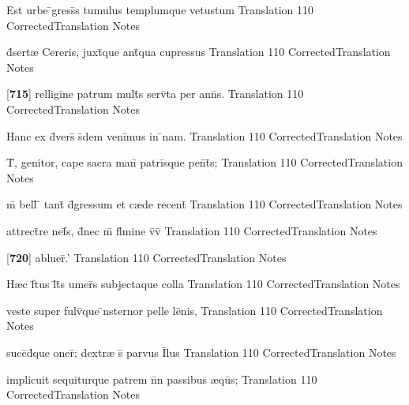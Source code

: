 \latline
  {Est urbe \={}gress\={\macron {\i}}s tumulus templumque vetustum}
  { Translation }
  {110}
  { CorrectedTranslation }
  { Notes }


\latline
  {d\={}sert{\ae} Cereris, juxt\={}que ant\={\macron {\i}}qua cupressus}
  { Translation }
  {110}
  { CorrectedTranslation }
  { Notes }


\latline
  {[\textbf{715}] relligi\={}ne patrum mult\={}s serv\={}ta per ann\={}s.}
  { Translation }
  {110}
  { CorrectedTranslation }
  { Notes }


\latline
  {Hanc ex d\={\macron {\i}}vers\={} s\={}dem veni\={}mus in \={}nam.}
  { Translation }
  {110}
  { CorrectedTranslation }
  { Notes }


\latline
  {T\={}, genitor, cape sacra man\={} patri\={}sque pen\={}t\={\macron {\i}}s;}
  { Translation }
  {110}
  { CorrectedTranslation }
  { Notes }


\latline
  {m\={} bell\={} \={} tant\={} d\={\macron {\i}}gressum et c{\ae}de recent\={\macron {\i}}}
  { Translation }
  {110}
  { CorrectedTranslation }
  { Notes }


\latline
  {attrect\={}re nef\={}s, d\={}nec m\={} fl\={}mine v\={\macron {\i}}v\={}}
  { Translation }
  {110}
  { CorrectedTranslation }
  { Notes }


\latline
  {[\textbf{720}] abluer\={}.'}
  { Translation }
  {110}
  { CorrectedTranslation }
  { Notes }


\latline
  {H{\ae}c f\={}tus l\={}t\={}s umer\={}s subjectaque colla}
  { Translation }
  {110}
  { CorrectedTranslation }
  { Notes }


\latline
  {veste super fulv\={\macron {\i}}que \={\macron {\i}}nsternor pelle le\={}nis,}
  { Translation }
  {110}
  { CorrectedTranslation }
  { Notes }


\latline
  {succ\={}d\={}que oner\={\macron {\i}}; dextr{\ae} s\={} parvus I\={}lus}
  { Translation }
  {110}
  { CorrectedTranslation }
  { Notes }


\latline
  {implicuit sequiturque patrem n\={}n passibus {\ae}qu\={\macron {\i}}s;}
  { Translation }
  {110}
  { CorrectedTranslation }
  { Notes }


